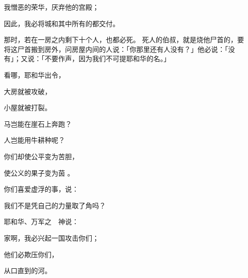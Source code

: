 {\par }{\Q 我憎恶{}的荣华，厌弃他的宫殿；
\par }{\Q 因此，我必将城和其中所有的都交付{}。
\par }{\PP {}那时，若在一房之内剩下十个人，也都必死。
死人的伯叔，就是烧他尸首的，要将这尸首搬到房外，问房屋内间的人说：「你那里还有人没有？」他必说：「没有」；又说：「不要作声，因为我们不可提耶和华的名。」
\par }{\Q {}看哪，耶和华出令，
\par }{\Q 大房就被攻破，
\par }{\Q 小屋就被打裂。
\par }{\Q {}马岂能在崖石上奔跑？
\par }{\Q 人岂能{}用牛耕种呢？
\par }{\Q 你们却使公平变为苦胆，
\par }{\Q 使公义的果子变为茵 。
\par }{\Q {}你们喜爱虚浮的事，{}说：
\par }{\Q 我们不是凭自己的力量取了角吗？
\par }{\Q {}耶和华、万军之　神说：
\par }{家啊，我必兴起一国攻击你们；
\par }{\Q 他们必欺压你们，
\par }{\Q 从{}口直到{}的河。

}
